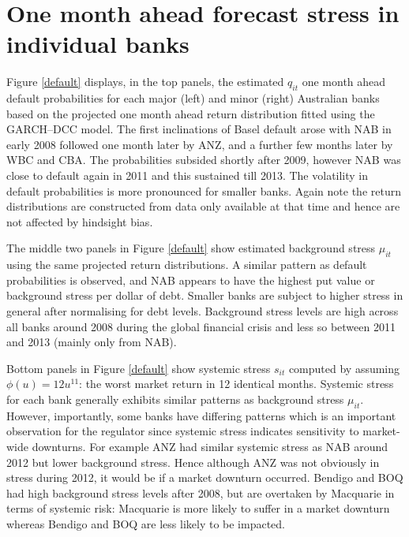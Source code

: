 \documentclass[12pt]{article}
\newcommand{\fref}[1]{Figure \ref{#1}}
\begin{document}
\section{One month ahead forecast stress in individual banks}\label{simulate1}

\fref{default} displays, in the top panels, the estimated $q_{it}$ one month ahead default probabilities for each major (left) and minor (right) Australian banks based on the projected one month ahead return distribution fitted using the GARCH--DCC model.  The first inclinations of Basel default arose with NAB in early 2008 followed one month later by ANZ, and  a further few months later by WBC and CBA. The probabilities subsided shortly after 2009, however NAB was close to default again in 2011 and this sustained till 2013. The volatility in default probabilities is more pronounced for smaller banks. Again note the return distributions are constructed from data only available at that time and hence are not affected by hindsight bias.

The middle two panels in \fref{default} show estimated background stress $\mu_{it}$ using the same projected return distributions. A similar pattern as default probabilities is observed, and NAB appears to have the highest put value or background stress per dollar of debt. Smaller banks are subject to higher stress in general after normalising for debt levels. Background stress levels are high across all banks around 2008 during the global financial crisis and less so between 2011 and 2013 (mainly only from NAB).


Bottom panels in \fref{default} show systemic stress $s_{it}$ computed by assuming $\phi(u)=12u^{11}$: the worst market return in 12 identical months. Systemic stress for each bank generally exhibits similar patterns as background stress $\mu_{it}$. However, importantly, some banks have differing patterns which is an important observation for the regulator since systemic stress indicates sensitivity to market-wide downturns. For example ANZ had similar systemic stress as NAB around 2012 but lower background stress. Hence although ANZ was not obviously in stress during 2012, it would be if a market downturn occurred. Bendigo and BOQ had high background stress levels after 2008, but are overtaken by Macquarie in terms of systemic risk: Macquarie is more likely to suffer in a market downturn whereas Bendigo and BOQ are less likely to be impacted.
\end{document}
